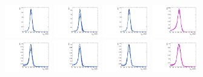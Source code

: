 \begin{figure}[htbp]
  \centering
  \includegraphics[width=0.18\textwidth]{fig/2Dfit/templateSignalVsMX_fromDC_VBFGbuToWW_MJJ_mu_HP_bb_LDy.pdf}
  \includegraphics[width=0.18\textwidth]{fig/2Dfit/templateSignalVsMX_fromDC_VBFRadToWW_MJJ_mu_HP_bb_LDy.pdf}
  \includegraphics[width=0.18\textwidth]{fig/2Dfit/templateSignalVsMX_fromDC_VBFZprToWW_MJJ_mu_HP_bb_LDy.pdf}
  \includegraphics[width=0.18\textwidth]{fig/2Dfit/templateSignalVsMX_fromDC_VBFWprToWZ_MJJ_mu_HP_bb_LDy.pdf}\\
  \includegraphics[width=0.18\textwidth]{fig/2Dfit/templateSignalVsMX_fromDC_VBFGbuToWW_MJJ_mu_LP_bb_LDy.pdf}
  \includegraphics[width=0.18\textwidth]{fig/2Dfit/templateSignalVsMX_fromDC_VBFRadToWW_MJJ_mu_LP_bb_LDy.pdf}
  \includegraphics[width=0.18\textwidth]{fig/2Dfit/templateSignalVsMX_fromDC_VBFZprToWW_MJJ_mu_LP_bb_LDy.pdf}
  \includegraphics[width=0.18\textwidth]{fig/2Dfit/templateSignalVsMX_fromDC_VBFWprToWZ_MJJ_mu_LP_bb_LDy.pdf}\\

\end{figure}
